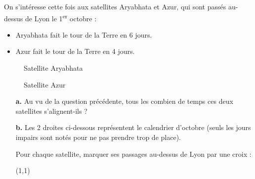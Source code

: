 \documentclass[a4paper,landscape,twocolumn]{article}
\begin{document}
\newpage

\begin{question}
	On s'intéresse cette fois aux satellites  	Aryabhata et Azur, qui sont passés au-dessus de Lyon le 1\textsuperscript{er} octobre :
	\begin{itemize}
		\item Aryabhata fait le tour de la Terre en 6 jours.
		\item Azur fait le tour de la Terre en 4 jours.
	\end{itemize}

	\begin{figure}[h!]
		\captionsetup{labelformat=empty}
		\begin{floatrow}
			{\caption{Satellite Aryabhata}}

			{\caption{Satellite Azur}}
		\end{floatrow}
	\end{figure}

	\begin{itemize}
		\item[\textbf{a.}] Au vu de la question précédente, tous les combien de temps ces deux satellites s'alignent-ils ?
		\item[\textbf{b.}] Les 2 droites ci-dessous représentent le calendrier d'octobre (seuls les jours impairs sont notés pour ne pas prendre trop de place).

		      Pour chaque satellite, marquer ses passages au-dessus de Lyon par une croix :

		      \begin{pspicture}(1,1)
		      \end{pspicture}


\end{itemize}
\end{question}
\end{document}
